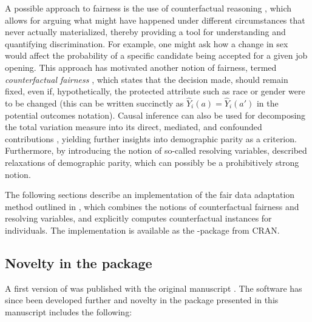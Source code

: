 \documentclass[
  nojss]{jss}
\begin{document}
A possible approach to fairness is the use of counterfactual reasoning
\citep{galles1998axiomatic}, which allows for arguing what might have
happened under different circumstances that never actually materialized,
thereby providing a tool for understanding and quantifying
discrimination. For example, one might ask how a change in sex would
affect the probability of a specific candidate being accepted for a
given job opening. This approach has motivated another notion of
fairness, termed \emph{counterfactual fairness}
\citep{kusner2017counterfactual}, which states that the decision made,
should remain fixed, even if, hypothetically, the protected attribute
such as race or gender were to be changed (this can be written
succinctly as \(\widehat{Y}_i(a) = \widehat{Y}_i(a')\) in the potential
outcomes notation). Causal inference can also be used for decomposing
the total variation measure into its direct, mediated, and confounded
contributions \citep{zhang2018fairness}, yielding further insights into
demographic parity as a criterion. Furthermore, by introducing the
notion of so-called resolving variables, \cite{kilbertus2017avoiding}
described relaxations of demographic parity, which can possibly be a
prohibitively strong notion.

The following sections describe an implementation of the fair data
adaptation method outlined in \cite{plecko2020fair}, which combines the
notions of counterfactual fairness and resolving variables, and
explicitly computes counterfactual instances for individuals. The
implementation is available as the -package 
from CRAN.

\hypertarget{novelty-in-the-package}{%
\subsection{Novelty in the package}\label{novelty-in-the-package}}

A first version of  was published with the original
manuscript \citep{plecko2020fair}. The software has since been developed
further and novelty in the package presented in this manuscript includes
the following:
\end{document}
